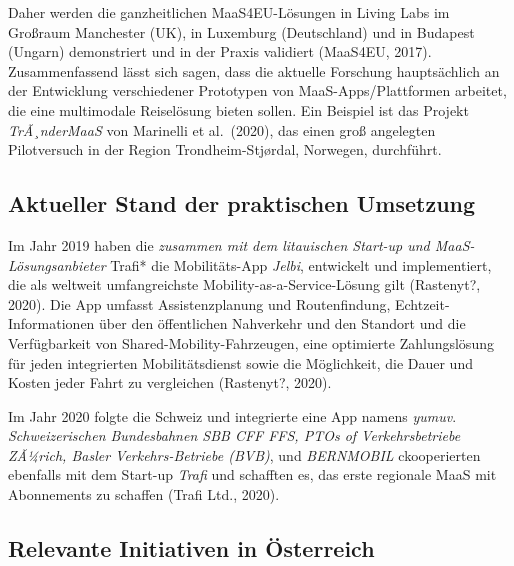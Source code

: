 \documentclass[
]{book}
\begin{document}
Daher werden die ganzheitlichen MaaS4EU-Lösungen in Living Labs im Großraum Manchester (UK), in Luxemburg (Deutschland) und in Budapest (Ungarn) demonstriert und in der Praxis validiert (MaaS4EU, 2017). Zusammenfassend lässt sich sagen, dass die aktuelle Forschung hauptsächlich an der Entwicklung verschiedener Prototypen von MaaS-Apps/Plattformen arbeitet, die eine multimodale Reiselösung bieten sollen. Ein Beispiel ist das Projekt \emph{TrÃ¸nderMaaS} von Marinelli et al.~(2020), das einen groß angelegten Pilotversuch in der Region Trondheim-Stjørdal, Norwegen, durchführt.

\hypertarget{aktueller-stand-der-praktischen-umsetzung-24}{%
\subsection*{Aktueller Stand der praktischen Umsetzung}\label{aktueller-stand-der-praktischen-umsetzung-24}}

Im Jahr 2019 haben die \emph{zusammen mit dem litauischen Start-up und MaaS-Lösungsanbieter }Trafi* die Mobilitäts-App \emph{Jelbi}, entwickelt und implementiert, die als weltweit umfangreichste Mobility-as-a-Service-Lösung gilt (Rastenyt?, 2020). Die App umfasst Assistenzplanung und Routenfindung, Echtzeit-Informationen über den öffentlichen Nahverkehr und den Standort und die Verfügbarkeit von Shared-Mobility-Fahrzeugen, eine optimierte Zahlungslösung für jeden integrierten Mobilitätsdienst sowie die Möglichkeit, die Dauer und Kosten jeder Fahrt zu vergleichen (Rastenyt?, 2020).

Im Jahr 2020 folgte die Schweiz und integrierte eine App namens \emph{yumuv}. \emph{Schweizerischen Bundesbahnen SBB CFF FFS, PTOs of Verkehrsbetriebe ZÃ¼rich, Basler Verkehrs-Betriebe (BVB)}, und \emph{BERNMOBIL} ckooperierten ebenfalls mit dem Start-up \emph{Trafi} und schafften es, das erste regionale MaaS mit Abonnements zu schaffen (Trafi Ltd., 2020).

\hypertarget{relevante-initiativen-in-uxf6sterreich-24}{%
\subsection*{Relevante Initiativen in Österreich}\label{relevante-initiativen-in-uxf6sterreich-24}}
\end{document}
